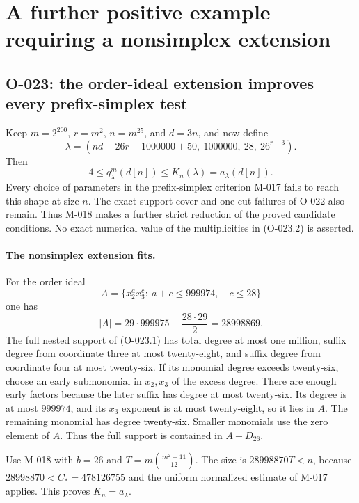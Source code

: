 \section{A further positive example requiring a nonsimplex extension}

\subsection{O-023: the order-ideal extension improves every prefix-simplex test}
Keep
$m=2^{200}$, $r=m^2$, $n=m^{25}$, and $d=3n$,
and now define
\[
 \lambda=(nd-26r-1000000+50,\ 1000000,\ 28,\ 26^{r-3}).
                                                               \tag{O-023.1}
\]
Then
\[
                 4\leq q^m_\lambda(d[n])
                               \leq K_n(\lambda)=a_\lambda(d[n]).
                                                               \tag{O-023.2}
\]
Every choice of parameters in the prefix-simplex criterion
M-017 fails to reach this shape at size $n$.
The exact support-cover and one-cut failures of O-022
also remain. Thus M-018 makes a further strict reduction
of the proved candidate conditions.
No exact numerical value of the multiplicities in
(O-023.2) is asserted.

\paragraph{The nonsimplex extension fits.}
For the order ideal
\[
 A=\{x_2^a x_3^c:\ a+c\leq999974,\quad c\leq28\}
\]
one has
\[
       |A|=29\cdot999975-\frac{28\cdot29}{2}
                          =28998869.
                                                               \tag{O-023.3}
\]
The full nested support of (O-023.1) has total degree
at most one million, suffix degree from coordinate three
at most twenty-eight, and suffix degree from coordinate
four at most twenty-six.
If its monomial degree exceeds twenty-six, choose an
early submonomial in $x_2,x_3$ of the excess degree.
There are enough early factors because the later suffix
has degree at most twenty-six. Its degree is at most
$999974$, and its $x_3$ exponent is at most twenty-eight,
so it lies in $A$. The remaining monomial has degree
twenty-six. Smaller monomials use the zero element of $A$.
Thus the full support is contained in $A+D_{26}$.

Use M-018 with $b=26$ and
$T=m\binom{m^2+11}{12}$.
The size is $28998870T<n$, because
$28998870<C_*=478126755$ and the uniform normalized
estimate of M-017 applies. This proves $K_n=a_\lambda$.

